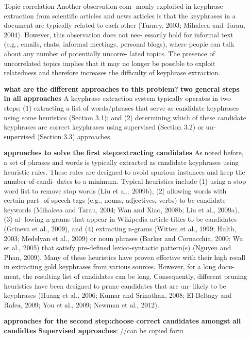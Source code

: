 Topic correlation Another observation com- monly exploited in keyphrase extraction from scientific articles and news articles is that the keyphrases in a document are typically related to each other (Turney, 2003; Mihalcea and Tarau, 2004). However, this observation does not nec- essarily hold for informal text (e.g., emails, chats, informal meetings, personal blogs), where people can talk about any number of potentially uncorre- lated topics. The presence of uncorrelated topics implies that it may no longer be possible to exploit relatedness and therefore increases the difficulty of keyphrase extraction.


\textbf{what are the different approaches to this problem?}
\textbf{two general steps in all approaches}
A keyphrase extraction system typically operates in two steps: (1) extracting a list of words/phrases that serve as candidate keyphrases using some
heuristics (Section 3.1); and (2) determining which of these candidate keyphrases are correct keyphrases using supervised (Section 3.2) or un- supervised (Section 3.3) approaches.\cite{KeyphraseSurvey}

\textbf{approaches to solve the first step:extracting candidates }
As noted before, a set of phrases and words is typically extracted as candidate keyphrases using heuristic rules. These rules are designed to avoid spurious instances and keep the number of candi- dates to a minimum. Typical heuristics include (1) using a stop word list to remove stop words (Liu et al., 2009b), (2) allowing words with certain part- of-speech tags (e.g., nouns, adjectives, verbs) to be candidate keywords (Mihalcea and Tarau, 2004; Wan and Xiao, 2008b; Liu et al., 2009a), (3) al- lowing n-grams that appear in Wikipedia article titles to be candidates (Grineva et al., 2009), and (4) extracting n-grams (Witten et al., 1999; Hulth, 2003; Medelyan et al., 2009) or noun phrases (Barker and Cornacchia, 2000; Wu et al., 2005) that satisfy pre-defined lexico-syntactic pattern(s) (Nguyen and Phan, 2009).\cite{KeyphraseSurvey}
Many of these heuristics have proven effective with their high recall in extracting gold keyphrases from various sources. However, for a long docu- ment, the resulting list of candidates can be long. Consequently, different pruning heuristics have been designed to prune candidates that are un- likely to be keyphrases (Huang et al., 2006; Kumar and Srinathan, 2008; El-Beltagy and Rafea, 2009; You et al., 2009; Newman et al., 2012).\cite{KeyphraseSurvey}

\textbf{approaches for the second step:choose correct candidates amongst all candidtes}
\textbf{Supervised approaches}: 
//can be copied form \cite{KeyphraseSurvey}\newline


